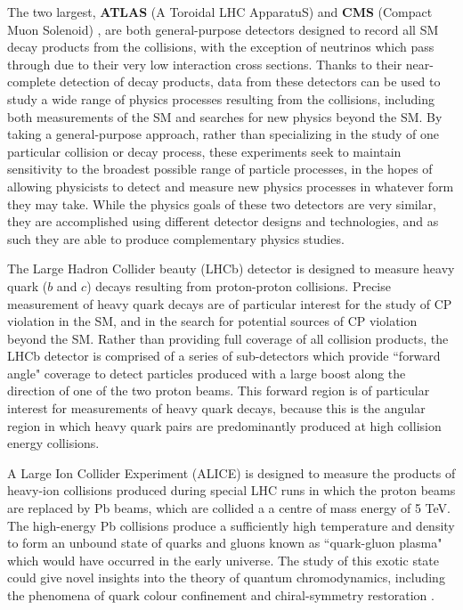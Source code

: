 The two largest, \textbf{ATLAS} (A Toroidal LHC ApparatuS) \cite{atlas} and \textbf{CMS} (Compact Muon Solenoid) \cite{cms}, are both general-purpose detectors designed to record all SM decay products from the collisions, with the exception of neutrinos which pass through due to their very low interaction cross sections. Thanks to their near-complete detection of decay products, data from these detectors can be used to study a wide range of physics processes resulting from the collisions, including both measurements of the SM and searches for new physics beyond the SM. By taking a general-purpose approach, rather than specializing in the study of one particular collision or decay process, these experiments seek to maintain sensitivity to the broadest possible range of particle processes, in the hopes of allowing physicists to detect and measure new physics processes in whatever form they may take. While the physics goals of these two detectors are very similar, they are accomplished using different detector designs and technologies, and as such they are able to produce complementary physics studies.

The Large Hadron Collider beauty (LHCb) detector \cite{LHCb} is designed to measure heavy quark ($b$ and $c$) decays resulting from proton-proton collisions. Precise measurement of heavy quark decays are of particular interest for the study of CP violation in the SM, and in the search for potential sources of CP violation beyond the SM. Rather than providing full coverage of all collision products, the LHCb detector is comprised of a series of sub-detectors which provide ``forward angle" coverage to detect particles produced with a large boost along the direction of one of the two proton beams. This forward region is of particular interest for measurements of heavy quark decays, because this is the angular region in which heavy quark pairs are predominantly produced at high collision energy collisions.

A Large Ion Collider Experiment (ALICE) \cite{ALICE} is designed to measure the products of heavy-ion collisions produced during special LHC runs in which the proton beams are replaced by Pb beams, which are collided a a centre of mass energy of 5 TeV. The high-energy Pb collisions produce a sufficiently high temperature and density to form an unbound state of quarks and gluons known as ``quark-gluon plasma" which would have occurred in the early universe. The study of this exotic state could give novel insights into the theory of quantum chromodynamics, including the phenomena of quark colour confinement and chiral-symmetry restoration \cite{quark_confinement, Karsch:845568}.


